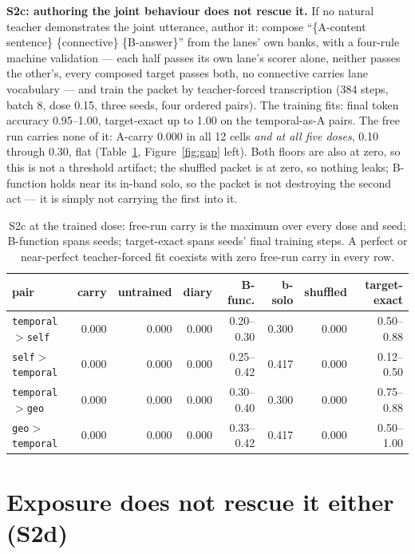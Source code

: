 \documentclass[11pt]{article}
\begin{document}
\textbf{S2c: authoring the joint behaviour does not rescue it.}  If no
natural teacher demonstrates the joint utterance, author it: compose
``\{A-content sentence\} \{connective\} \{B-answer\}'' from the lanes'
own banks, with a four-rule machine validation --- each half passes its own
lane's scorer alone, neither passes the other's, every composed target
passes both, no connective carries lane vocabulary --- and train the packet
by teacher-forced transcription (384 steps, batch 8, dose 0.15, three
seeds, four ordered pairs).  The training fits: final token accuracy
0.95--1.00, target-exact up to 1.00 on
the temporal-as-A pairs.  The free run carries none of it: A-carry
0.000 in all 12 cells \emph{and at all five doses}, 0.10
through 0.30, flat (Table~\ref{tab:s2c}, Figure~\ref{fig:gap} left).
Both floors are also at zero, so this is not a threshold artifact; the
shuffled packet is at zero, so nothing leaks; B-function holds near its
in-band solo, so the packet is not destroying the second act --- it is
simply not carrying the first into it.

\begin{table}[t]
\centering
\small
\setlength{\tabcolsep}{4pt}
\begin{tabular}{lrrrrrrr}
\toprule
pair & carry & untrained & diary & B-func. & b-solo & shuffled & target-exact \\
\midrule
\texttt{temporal$>$self} & 0.000 & 0.000 & 0.000 & 0.20--0.30 & 0.300 & 0.000 & 0.50--0.88 \\
\texttt{self$>$temporal} & 0.000 & 0.000 & 0.000 & 0.25--0.42 & 0.417 & 0.000 & 0.12--0.50 \\
\texttt{temporal$>$geo} & 0.000 & 0.000 & 0.000 & 0.30--0.40 & 0.300 & 0.000 & 0.75--0.88 \\
\texttt{geo$>$temporal} & 0.000 & 0.000 & 0.000 & 0.33--0.42 & 0.417 & 0.000 & 0.50--1.00 \\
\bottomrule
\end{tabular}
\caption{S2c at the trained dose: free-run carry is the maximum over every
dose and seed; B-function spans seeds; target-exact spans seeds' final
training steps.  A perfect or near-perfect teacher-forced fit coexists with
zero free-run carry in every row.}
\label{tab:s2c}
\end{table}

\section{Exposure does not rescue it either (S2d)}
\end{document}
